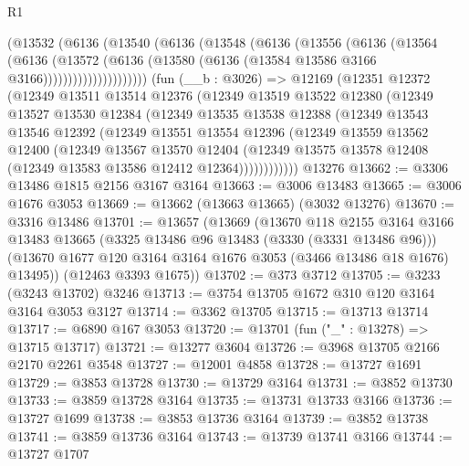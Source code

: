 \begin{lexlean}{R1}
\begin{coremodule}
                (@13532
                  (@6136
                    (@13540
                      (@6136
                        (@13548
                          (@6136
                            (@13556
                              (@6136
                                (@13564
                                  (@6136
                                    (@13572
                                      (@6136
                                        (@13580
                                          (@6136 (@13584 @13586 @3166 @3166)))))))))))))))))))))
    (fun (__b : @3026) =>
    @12169
      (@12351
        @12372
        (@12349
          @13511
          @13514
          @12376
          (@12349
            @13519
            @13522
            @12380
            (@12349
              @13527
              @13530
              @12384
              (@12349
                @13535
                @13538
                @12388
                (@12349
                  @13543
                  @13546
                  @12392
                  (@12349
                    @13551
                    @13554
                    @12396
                    (@12349
                      @13559
                      @13562
                      @12400
                      (@12349
                        @13567
                        @13570
                        @12404
                        (@12349 @13575 @13578 @12408 (@12349 @13583 @13586 @12412 @12364))))))))))))
    @13276
@13662 := @3306 @13486 @1815 @2156 @3167 @3164
@13663 := @3006 @13483
@13665 := @3006 @1676 @3053
@13669 := @13662 (@13663 @13665) (@3032 @13276)
@13670 := @3316 @13486
@13701 := @13657
    (@13669
      (@13670
        @118
        @2155
        @3164
        @3166
        @13483
        @13665
        (@3325 @13486 @96 @13483 (@3330 (@3331 @13486 @96)))
        (@13670 @1677 @120 @3164 @3164 @1676 @3053 (@3466 @13486 @18 @1676) @13495))
      (@12463 @3393 @1675))
@13702 := @373 @3712
@13705 := @3233 (@3243 @13702) @3246
@13713 := @3754 @13705 @1672 @310 @120 @3164 @3164 @3053 @3127
@13714 := @3362 @13705
@13715 := @13713 @13714
@13717 := @6890 @167 @3053
@13720 := @13701 (fun ("_" : @13278) => @13715 @13717)
@13721 := @13277 @3604
@13726 := @3968 @13705 @2166 @2170 @2261 @3548
@13727 := @12001 @4858
@13728 := @13727 @1691
@13729 := @3853 @13728
@13730 := @13729 @3164
@13731 := @3852 @13730
@13733 := @3859 @13728 @3164
@13735 := @13731 @13733 @3166
@13736 := @13727 @1699
@13738 := @3853 @13736 @3164
@13739 := @3852 @13738
@13741 := @3859 @13736 @3164
@13743 := @13739 @13741 @3166
@13744 := @13727 @1707

\end{coremodule}
\end{lexlean}
